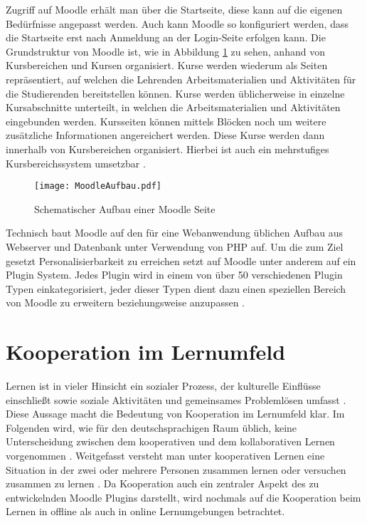 Zugriff auf Moodle erhält man über die Startseite, diese kann auf die eigenen Bedürfnisse angepasst werden. Auch kann Moodle so konfiguriert werden, dass die Startseite erst nach Anmeldung an der Login-Seite erfolgen kann. Die Grundstruktur von Moodle ist, wie in Abbildung \ref{fig:MoodleAufbau} zu sehen, anhand von Kursbereichen und Kursen organisiert. Kurse werden wiederum als Seiten repräsentiert, auf welchen die Lehrenden Arbeitsmaterialien und Aktivitäten für die Studierenden bereitstellen können. Kurse werden üblicherweise in einzelne Kursabschnitte unterteilt, in welchen die Arbeitsmaterialien und Aktivitäten eingebunden werden. Kursseiten können mittels Blöcken noch um weitere zusätzliche Informationen angereichert werden. Diese Kurse werden dann innerhalb von Kursbereichen organisiert. Hierbei ist auch ein mehrstufiges Kursbereichssystem umsetzbar \citep{moodle2015aufbau}.

\begin{figure}[h!]
\texttt{[image: MoodleAufbau.pdf]}
\caption{\label{fig:MoodleAufbau}Schematischer Aufbau einer Moodle Seite}
\end{figure}

Technisch baut Moodle auf den für eine Webanwendung üblichen Aufbau aus Webserver und Datenbank unter Verwendung von PHP auf. Um die zum Ziel gesetzt Personalisierbarkeit zu erreichen setzt auf Moodle unter anderem auf ein Plugin System. Jedes Plugin wird in einem von über 50 verschiedenen Plugin Typen einkategorisiert, jeder dieser Typen dient dazu einen speziellen Bereich von Moodle zu erweitern beziehungsweise anzupassen \citep{moodle2017plugin}.


\section{Kooperation im Lernumfeld}
\glqq Lernen ist in vieler Hinsicht ein sozialer Prozess, der kulturelle Einflüsse einschließt sowie soziale Aktivitäten und gemeinsames Problemlösen umfasst\grqq{} \citep{reinmann1995kooperation}. Diese Aussage macht die Bedeutung von Kooperation im Lernumfeld klar. Im Folgenden wird, wie für den deutschsprachigen Raum üblich, keine Unterscheidung zwischen dem kooperativen und dem kollaborativen Lernen vorgenommen \citep{reinmann2002analyse}. Weitgefasst versteht man unter kooperativen Lernen eine Situation in der zwei oder mehrere Personen zusammen lernen oder versuchen zusammen zu lernen \citep{dillenbourg1999collaborative}. Da Kooperation auch ein zentraler Aspekt des zu entwickelnden Moodle Plugins darstellt, wird nochmals auf die Kooperation beim Lernen in offline als auch in online Lernumgebungen betrachtet.

